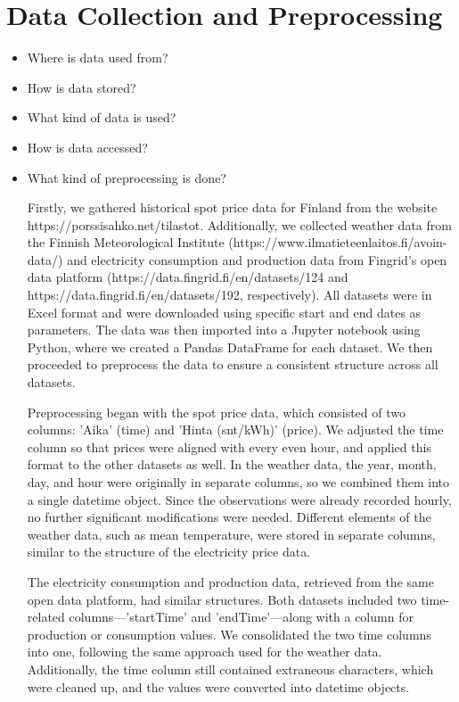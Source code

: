 \documentclass{article}
\numberwithin{equation}{section}
\begin{document}
\section{Data Collection and Preprocessing}
\begin{itemize}
	\item Where is data used from?
	\item How is data stored?
	\item What kind of data is used?
	\item How is data accessed?
	\item What kind of preprocessing is done?

	Firstly, we gathered historical spot price data for Finland from the website https://porssisahko.net/tilastot. Additionally, we collected weather data from the Finnish Meteorological Institute (https://www.ilmatieteenlaitos.fi/avoin-data/) and electricity consumption and production data from Fingrid's open data platform (https://data.fingrid.fi/en/datasets/124 and https://data.fingrid.fi/en/datasets/192, respectively). All datasets were in Excel format and were downloaded using specific start and end dates as parameters. The data was then imported into a Jupyter notebook using Python, where we created a Pandas DataFrame for each dataset. We then proceeded to preprocess the data to ensure a consistent structure across all datasets.

Preprocessing began with the spot price data, which consisted of two columns: 'Aika' (time) and 'Hinta (snt/kWh)' (price). We adjusted the time column so that prices were aligned with every even hour, and applied this format to the other datasets as well. In the weather data, the year, month, day, and hour were originally in separate columns, so we combined them into a single datetime object. Since the observations were already recorded hourly, no further significant modifications were needed. Different elements of the weather data, such as mean temperature, were stored in separate columns, similar to the structure of the electricity price data.

The electricity consumption and production data, retrieved from the same open data platform, had similar structures. Both datasets included two time-related columns—'startTime' and 'endTime'—along with a column for production or consumption values. We consolidated the two time columns into one, following the same approach used for the weather data. Additionally, the time column still contained extraneous characters, which were cleaned up, and the values were converted into datetime objects.


\end{itemize}
\end{document}

